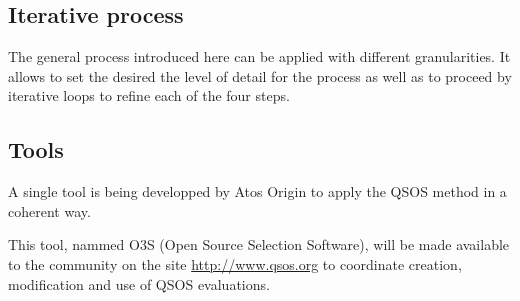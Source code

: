 \subsection{Iterative process}
The general process introduced here can be applied with different granularities. 
It allows to set the desired the level of detail for the process as well as to proceed by iterative 
loops to refine each of the four steps.


\subsection{Tools}
A single tool is being developped by Atos Origin to apply the QSOS method in a coherent way.

This tool, nammed O3S (Open Source Selection Software), will be made available to the community on the site \url{http://www.qsos.org} to coordinate creation, modification and use of QSOS evaluations.


